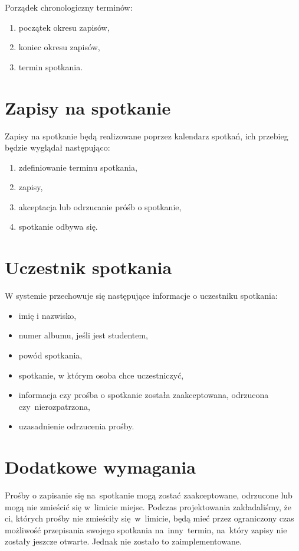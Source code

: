 \documentclass[licencjacka]{pracamgr}
\begin{document}
Porządek chronologiczny terminów:

\begin{enumerate}
\setlength\itemsep{0,05em}
    \item początek okresu zapisów,
    \item koniec okresu zapisów,
    \item termin spotkania.
\end{enumerate}

\section{Zapisy na spotkanie}
Zapisy na spotkanie będą realizowane poprzez kalendarz spotkań, ich przebieg będzie wyglądał następująco:

\begin{enumerate}
    \item zdefiniowanie terminu spotkania,
    \item zapisy,
    \item akceptacja lub odrzucanie próśb o spotkanie,
    \item spotkanie odbywa się.
\end{enumerate}

\section{Uczestnik spotkania}
W systemie przechowuje się następujące informacje o uczestniku spotkania:

\begin{itemize}
\setlength\itemsep{0,05em}
    \item imię i nazwisko,
    \item numer albumu, jeśli jest studentem,
    \item powód spotkania,
    \item spotkanie, w którym osoba chce uczestniczyć,
    \item informacja czy prośba o spotkanie została zaakceptowana, odrzucona czy~nierozpatrzona,
    \item uzasadnienie odrzucenia prośby.
\end{itemize}

\section{Dodatkowe wymagania}
Prośby o zapisanie się na~spotkanie mogą zostać zaakceptowane, odrzucone lub mogą nie zmieścić się w~limicie miejsc. Podczas projektowania zakładaliśmy, że ci, których prośby nie zmieściły się~w~limicie, będą mieć przez ograniczony czas możliwość przepisania swojego spotkania na~inny~termin, na~który zapisy nie zostały jeszcze otwarte. Jednak nie zostało to zaimplementowane.
\end{document}
